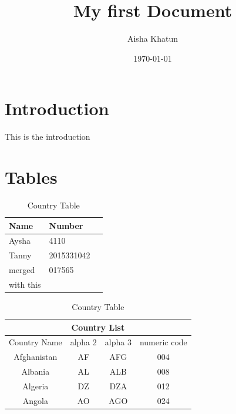 \documentclass[a4paper,12pt]{article}
\begin{document}
\title{My first Document}
\author{Aisha Khatun}
\date{\today}
\maketitle

\tableofcontents
\listoftables
\listoffigures
\newpage
{}

\section{Introduction}
This is the introduction

\section{Tables}
{\begin{table}[ht]
\caption{Table of names and numbers}
\label{table1}
\begin{tabular}{|l|l|r|}
\hline
\textbf{Name} & \textbf{Number} \\
\hline
Aysha & 4110\\
\hline
Tanny & 2015331042\\
\hline
merged & 017565\\
\cline{1-1}
with this & \\
\hline
\end{tabular}
\caption{Country Table}
\label{table2}
\begin{tabular}{|c|c|c|c|}
\hline
\multicolumn{4}{|c|}{Country List}\\
\hline
Country Name & alpha 2 & alpha 3 & numeric code\\
\hline
Afghanistan & AF & AFG & 004\\
Albania & AL & ALB & 008\\
Algeria & DZ & DZA & 012\\
Angola & AO & AGO & 024 \\
\hline
\end{tabular}
\end{table}}
\end{document}
